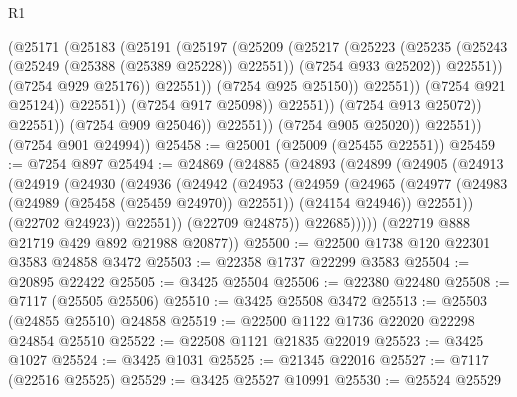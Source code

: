 \begin{lexlean}{R1}
\begin{coremodule}
                                      (@25171
                                        (@25183
                                          (@25191
                                            (@25197
                                              (@25209
                                                (@25217
                                                  (@25223
                                                    (@25235
                                                      (@25243
                                                        (@25249 (@25388 (@25389 @25228)) @22551))
                                                      (@7254 @933 @25202))
                                                    @22551))
                                                (@7254 @929 @25176))
                                              @22551))
                                          (@7254 @925 @25150))
                                        @22551))
                                    (@7254 @921 @25124))
                                  @22551))
                              (@7254 @917 @25098))
                            @22551))
                        (@7254 @913 @25072))
                      @22551))
                  (@7254 @909 @25046))
                @22551))
            (@7254 @905 @25020))
          @22551))
      (@7254 @901 @24994))
@25458 := @25001 (@25009 (@25455 @22551))
@25459 := @7254 @897
@25494 := @24869
    (@24885
      (@24893
        (@24899
          (@24905
            (@24913
              (@24919
                (@24930
                  (@24936
                    (@24942
                      (@24953
                        (@24959
                          (@24965
                            (@24977
                              (@24983 (@24989 (@25458 (@25459 @24970)) @22551))
                              (@24154 @24946))
                            @22551))
                        (@22702 @24923))
                      @22551))
                  (@22709 @24875))
                @22685)))))
      (@22719 @888 @21719 @429 @892 @21988 @20877))
@25500 := @22500 @1738 @120 @22301 @3583 @24858 @3472
@25503 := @22358 @1737 @22299 @3583
@25504 := @20895 @22422
@25505 := @3425 @25504
@25506 := @22380 @22480
@25508 := @7117 (@25505 @25506)
@25510 := @3425 @25508 @3472
@25513 := @25503 (@24855 @25510) @24858
@25519 := @22500 @1122 @1736 @22020 @22298 @24854 @25510
@25522 := @22508 @1121 @21835 @22019
@25523 := @3425 @1027
@25524 := @3425 @1031
@25525 := @21345 @22016
@25527 := @7117 (@22516 @25525)
@25529 := @3425 @25527 @10991
@25530 := @25524 @25529

\end{coremodule}
\end{lexlean}
